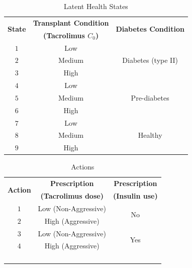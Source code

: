 \documentclass[opre,nonblindrev]{informs2}%
\newcommand{\1}{\hbox{\rm 1\kern-.35em 1}}
\begin{document}
{
	\renewcommand{\arraystretch}{1.2}
	\begin{table}[t]
				\caption{\baselineskip=10pt Latent Health States}\label{Table:States}
				\begin{center}
\scriptsize
		   \begin{tabular}{ccc}
				\hline
				\multirow{2}{*}{{\bf State}} & \multicolumn{1}{c}{\bf Transplant Condition} & \multirow{2}{*}{{\bf Diabetes Condition}} \\
				& \multicolumn{1}{c}{\bf (Tacrolimus $C_0$)} & \\
				\hline
				$1$ & Low & \multirow{3}{*}{Diabetes (type II)} \\
				$2$ & Medium &  \\
				$3$ & High &  \\ \hline
				$4$ & Low & \multirow{3}{*}{Pre-diabetes} \\
				$5$ & Medium & \\
				$6$ & High & \\ \hline
				$7$ & Low & \multirow{3}{*}{Healthy} \\
				$8$ & Medium & \\
				$9$ & High & \\
				\hline
				
			\end{tabular}
		\end{center}
	\end{table}
}

{
\renewcommand{\arraystretch}{1.2}
	\begin{table}[b]
				\caption{\baselineskip=10pt Actions}\label{Table:Actions}
		\begin{center}
			\scriptsize
			\begin{tabular}{ccc}
				\hline
				\multirow{2}{*}{{\bf Action}} & \multicolumn{1}{c}{\bf Prescription} & \multicolumn{1}{c}{\bf Prescription} \\
				& \multicolumn{1}{c}{\bf (Tacrolimus dose)} & \multicolumn{1}{c}{\bf (Insulin use)} \\ \hline
				$1$ & Low (Non-Aggressive) & \multirow{2}{*}{No} \\
				$2$ & High (Aggressive) & \\ \hline
				$3$ & Low (Non-Aggressive) & \multirow{2}{*}{Yes} \\
				$4$ &High (Aggressive)& \\
				\hline
				& & \\ \\
				& & \\ \\
			\end{tabular}
		\end{center}
	\end{table}
}
\end{document}
